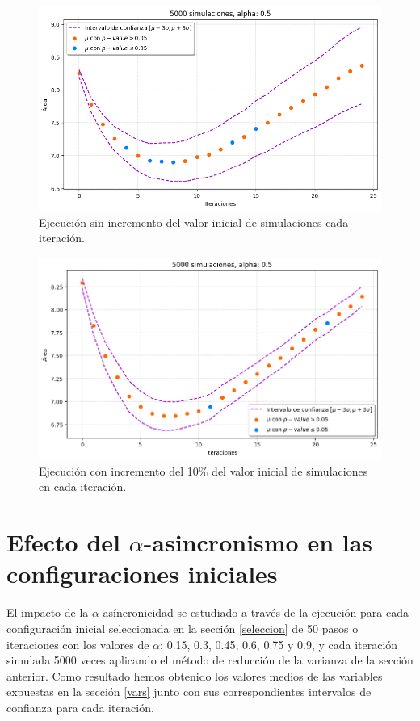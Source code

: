 \documentclass[../proyecto.tex]{memoir}
\begin{document}
\begin{figure}[H]
	\centering
    \includegraphics[width=\textwidth]{./images/iteracion_without_inc.png}
    \caption{Ejecución sin incremento del valor inicial de simulaciones cada iteración.}
    \label{fig:3-1}
\end{figure}

\begin{figure}[H]
        \centering
        \includegraphics[width=\textwidth]{./images/iteracion_inc.png}
        \caption{Ejecución con incremento del 10\% del valor inicial de simulaciones en cada iteración.}
        \label{fig:3-2}
\end{figure} 

\section{Efecto del $\alpha$-asincronismo en las configuraciones iniciales}

El impacto de la $\alpha$-asíncronicidad se estudiado a través de la ejecución para cada configuración inicial seleccionada en la sección \ref{seleccion} de 50 pasos o iteraciones con los valores de $\alpha$: 0.15, 0.3, 0.45, 0.6, 0.75 y 0.9, y cada iteración simulada 5000 veces aplicando el método de reducción de la varianza de la sección anterior. Como resultado hemos obtenido los valores medios de las variables expuestas en la sección \ref{vars} junto con sus correspondientes intervalos de confianza para cada iteración.
\end{document}
